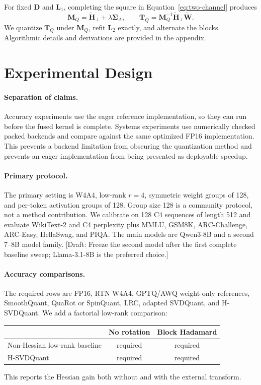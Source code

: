 \documentclass{article}
\newcommand{\method}{H-SVDQuant}
\newcommand{\W}{\bm{W}}
\newcommand{\Hess}{\bm{H}}
\newcommand{\D}{\bm{D}}
\newcommand{\Lo}{\bm{L}_1}
\newcommand{\Lt}{\bm{L}_2}
\newcommand{\draftnote}[1]{\textcolor{red!70!black}{[Draft: #1]}}
\begin{document}
For fixed $\D$ and $\Lo$, completing the square in
Equation~\ref{eq:two-channel} produces
\begin{equation}
\bm{M}_Q=\widetilde{\Hess}_{\perp}+\lambda\bm{\Sigma}_A,
\qquad
\bm{T}_Q=\bm{M}_Q^{-1}\widetilde{\Hess}_{\perp}\widetilde{\W}.
\label{eq:joint-target}
\end{equation}
We quantize $\bm{T}_Q$ under $\bm{M}_Q$, refit $\Lt$ exactly, and alternate the
blocks. Algorithmic details and derivations are provided in the appendix.

\section{Experimental Design}
\label{sec:experiments}

\paragraph{Separation of claims.}
Accuracy experiments use the eager reference implementation, so they can run
before the fused kernel is complete. Systems experiments use numerically checked
packed backends and compare against the same optimized FP16 implementation.
This prevents a backend limitation from obscuring the quantization method and
prevents an eager implementation from being presented as deployable speedup.

\paragraph{Primary protocol.}
The primary setting is W4A4, low-rank $r=4$, symmetric weight groups of 128,
and per-token activation groups of 128. Group size 128 is a community protocol,
not a method contribution. We calibrate on 128 C4 sequences of length 512 and
evaluate WikiText-2 and C4 perplexity plus MMLU, GSM8K, ARC-Challenge,
ARC-Easy, HellaSwag, and PIQA. The main models are Qwen3-8B and a second 7--8B
model family. \draftnote{Freeze the second model after the first complete
baseline sweep; Llama-3.1-8B is the preferred choice.}

\paragraph{Accuracy comparisons.}
The required rows are FP16, RTN W4A4, GPTQ/AWQ weight-only references,
SmoothQuant, QuaRot or SpinQuant, LRC, adapted SVDQuant, and \method{}. We add a
factorial low-rank comparison:
\begin{center}
\begin{tabular}{lcc}
\toprule
 & No rotation & Block Hadamard \\
\midrule
Non-Hessian low-rank baseline & required & required \\
\method{} & required & required \\
\bottomrule
\end{tabular}
\end{center}
This reports the Hessian gain both without and with the external transform.
\end{document}

